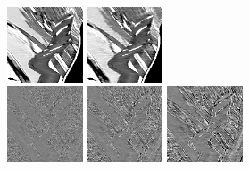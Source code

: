 \documentclass[10pt, journal, twocolumn, final, a4paper]{IEEEtran}
\begin{document}
\begin{figure}[thpb!]
\begin{center}
		\includegraphics[width=0.2\textwidth]{figs/temporal_slices/slice_mobile_mono_bm4d_s20_row220_col040-180_fra080-220.png}%
		\includegraphics[width=0.2\textwidth]{figs/temporal_slices/slice_mobile_mono_bm4d_s40_row220_col040-180_fra080-220.png}\\
		               \hspace{0.2\textwidth}%
		\includegraphics[width=0.2\textwidth]{figs/temporal_slices/slice_mobile_mono_diff_bm4d_s10_row220_col040-180_fra080-220.png}%
		\includegraphics[width=0.2\textwidth]{figs/temporal_slices/slice_mobile_mono_diff_bm4d_s20_row220_col040-180_fra080-220.png}%
		\includegraphics[width=0.2\textwidth]{figs/temporal_slices/slice_mobile_mono_diff_bm4d_s40_row220_col040-180_fra080-220.png}\\

\end{center}
\end{figure}
\end{document}
